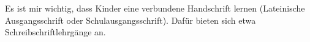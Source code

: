 Es ist mir wichtig, dass Kinder eine verbundene Handschrift lernen (Lateinische Ausgangsschrift oder Schulausgangsschrift).
Dafür bieten sich etwa Schreibschriftlehrgänge an.